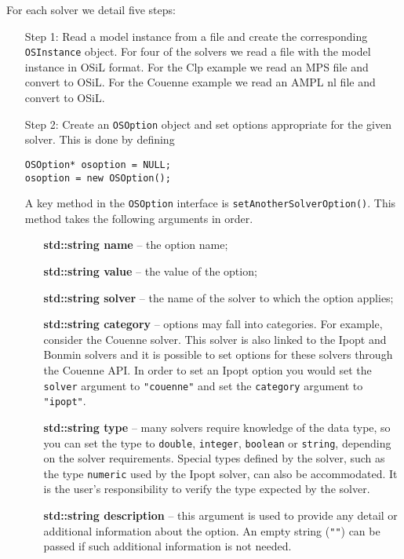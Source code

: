 \documentclass[11pt]{article}
\renewcommand{\{}{{\char"7B}}
\renewcommand{\}}{{\char"7D}}
\renewcommand{\^}{{\char"0D}}
\renewcommand{\'}{{\char"0D}}
\begin{document}
For each solver we detail five steps:

\begin{itemize}
\item[Step 1:]  Read a model instance from a file  and create the corresponding {\tt OSInstance} object.
For four of the solvers we read a file with the model instance in OSiL format. For the Clp example 
we read an MPS file and convert to OSiL. For the Couenne example we read an AMPL nl file and convert 
to OSiL.

\item[Step 2:]  Create an {\tt OSOption} object and set options appropriate for the given solver.   
This is done by defining

\begin{verbatim}
OSOption* osoption = NULL;
osoption = new OSOption();
\end{verbatim}

A key method in the {\tt OSOption} interface is {\tt setAnotherSolverOption()}.  This method 
takes the following arguments in order.

\begin{itemize}
\item[] {\bf std::string name} -- the option name;
\item[] {\bf std::string value}  -- the value of the option;
\item[] {\bf std::string solver} -- the name of the solver to which the option applies;
\item[] {\bf std::string category} -- options may fall into categories. For example, consider the  
 Couenne solver.  This solver is also linked to the Ipopt and Bonmin solvers and  it is possible 
to set options for these solvers through the Couenne API. In order to set an Ipopt option 
you would set the {\tt solver} argument to {\tt "couenne"} and set the {\tt category} argument 
to {\tt "ipopt"}.

\item[] {\bf std::string type} -- many solvers require knowledge of the data type, so you can set 
the type to {\tt double}, {\tt integer}, {\tt boolean} or {\tt string}, depending on the solver 
requirements. Special types defined by the solver, such as the type {\tt numeric} used by the
Ipopt solver, can also be accommodated. It is the user's responsibility to verify the type
expected by the solver.


\item[] {\bf std::string  description} -- this argument is used to provide any detail or 
additional information about the option. An empty string ({\tt""}) can be passed if such additional
information is not needed.
\end{itemize}


\end{itemize}
\end{document}
